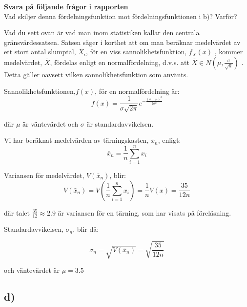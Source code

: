 \documentclass[a4paper]{article}
\begin{document}
\textbf{Svara på följande frågor i rapporten}\\
Vad skiljer denna fördelningsfunktion mot fördelningsfunktionen i b)? Varför?
\newpage

Vad du sett ovan är vad man inom statistiken kallar den centrala gränsvärdessatsen.
Satsen säger i korthet att om man beräknar medelvärdet av ett stort antal slumptal,
\( X_i \), för en viss sannolikhetsfunktion, \(f_X(x)\) , kommer medelvärdet, \(\bar{X}\),
fördelas enligt en normalfördelning, d.v.s. att \(\bar{X} \in N(\mu,\frac{\sigma}{\sqrt{n}})\) . Detta gäller oavsett
vilken sannolikhetsfunktion som använts.


Sannolikhetsfunktionen,\(f(x)\), för en normalfördelning är:
\begin{equation} \label{eqn:normf}
    f(x)=\frac{1}{\sigma\sqrt{2\pi}}e^{-\frac{(x-\mu)^2}{2\sigma^2}}
\end{equation}

där \( \mu \) är väntevärdet och \( \sigma \) är standardavvikelsen.

Vi har beräknat medelvärden av tärningskasten, \( \bar{x}_n \), enligt:
\begin{equation} \label{eqn:tarning_medel}
    \bar{x}_n = \frac{1}{n}\sum_{i=1}^n x_i
\end{equation}

Variansen för medelvärdet, \( V(\bar{x}_n) \), blir:
\begin{equation} \label{eqn:varians}
    V(\bar{x}_n)=V\left(\frac{1}{n}\sum_{i=1}^nx_i\right)= \frac{1}{n}V(x)=\frac{35}{12n}
\end{equation}

där talet \( \frac{35}{12}\approx 2.9 \) är variansen för en tärning, som har visats på föreläsning.

Standardavvikelsen, \( \sigma_n\), blir då:

\begin{equation} \label{eqn:stdev}
    \sigma_n=\sqrt{V(\bar{x}_n)}=\sqrt{\frac{35}{12n}}
\end{equation}

och väntevärdet är \( \mu=3.5 \)


\subsection{d)}
\end{document}
